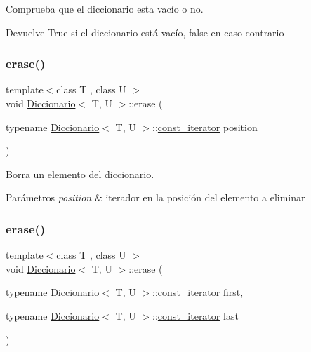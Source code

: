 Comprueba que el diccionario esta vacío o no. 

\begin{DoxyReturn}{Devuelve}
True si el diccionario está vacío, false en caso contrario 
\end{DoxyReturn}
\mbox{\label{classDiccionario_aa608225f0f34fabbb6955eb834f13b89}} 
\subsubsection{\texorpdfstring{erase()}{erase()}\hspace{0.1cm}{\footnotesize\ttfamily [1/2]}}
{\footnotesize\ttfamily template$<$class T , class U $>$ \\
void \hyperlink{classDiccionario}{Diccionario}$<$ T, U $>$\+::erase (\begin{DoxyParamCaption}\item[{typename \hyperlink{classDiccionario}{Diccionario}$<$ T, U $>$\+::\hyperlink{classDiccionario_1_1const__iterator}{const\+\_\+iterator}}]{position }\end{DoxyParamCaption})}



Borra un elemento del diccionario. 


\begin{DoxyParams}{Parámetros}
{\em position} & iterador en la posición del elemento a eliminar \\
\hline
\end{DoxyParams}
\mbox{\label{classDiccionario_ae404124f4fa5c5d08e06944692f40397}} 
\subsubsection{\texorpdfstring{erase()}{erase()}\hspace{0.1cm}{\footnotesize\ttfamily [2/2]}}
{\footnotesize\ttfamily template$<$class T , class U $>$ \\
void \hyperlink{classDiccionario}{Diccionario}$<$ T, U $>$\+::erase (\begin{DoxyParamCaption}\item[{typename \hyperlink{classDiccionario}{Diccionario}$<$ T, U $>$\+::\hyperlink{classDiccionario_1_1const__iterator}{const\+\_\+iterator}}]{first,  }\item[{typename \hyperlink{classDiccionario}{Diccionario}$<$ T, U $>$\+::\hyperlink{classDiccionario_1_1const__iterator}{const\+\_\+iterator}}]{last }\end{DoxyParamCaption})}



